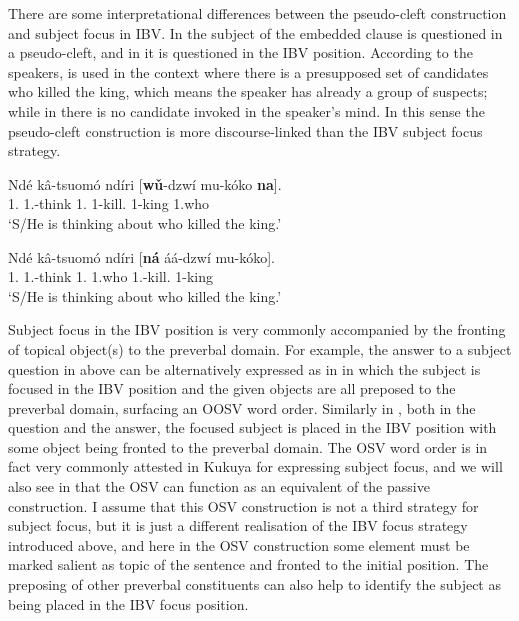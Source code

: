 \documentclass[output=paper,colorlinks,citecolor=brown,
]{langscibook}
\begin{document}
There are some interpretational differences between the pseudo-cleft construction and subject focus in IBV. In  the subject of the embedded clause is questioned in a pseudo-cleft, and in  it is questioned in the IBV position. According to the speakers,  is used in the context where there is a presupposed set of candidates who killed the king, which means the speaker has already a group of suspects; while in  there is no candidate invoked in the speaker's mind. In this sense the pseudo-cleft construction is more discourse-linked than the IBV subject focus strategy.
\begin{exe}
    \ex \label{40}
    \begin{xlist}
\ex
\label{40a}
\gll
Ndé kâ-tsuomó ndíri [\textbf{wǔ}-dzwí mu-kóko \textbf{na}].\\
1.\Pro{} 1\Sm{}.\Prs{}-think 1.\Comp{} {\db}1\Rel{}-kill.\Pst{} 1-king 1.who\\
\trans ‘S/He is thinking about who killed the king.’

\ex
\label{40b}
\gll
Ndé kâ-tsuomó ndíri [\textbf{ná} áá-dzwí mu-kóko].\\
1.\Pro{} 1\Sm{}.\Prs{}-think 1.\Comp{} {\db}1.who 1\Sm{}.\Pst{}-kill.\Pst{} 1-king\\
\trans ‘S/He is thinking about who killed the king.’

    \end{xlist}
\end{exe} 
Subject focus in the IBV position is very commonly accompanied by the fronting of topical object(s) to the preverbal domain. For example, the answer to a subject question in  above can be alternatively expressed as in  in which the subject is focused in the IBV position and the given objects are all preposed to the preverbal domain, surfacing an OOSV word order. Similarly in , both in the question and the answer, the focused subject is placed in the IBV position with some object being fronted to the preverbal domain. The OSV word order is in fact very commonly attested in Kukuya for expressing subject focus, and we will also see in  that the OSV can function as an equivalent of the passive construction. I assume that this OSV construction is not a third strategy for subject focus, but it is just a different realisation of the IBV focus strategy introduced above, and here in the OSV construction some element must be marked salient as topic of the sentence and fronted to the initial position. The preposing of other preverbal constituents can also help to identify the subject as being placed in the IBV focus position. 
\end{document}
